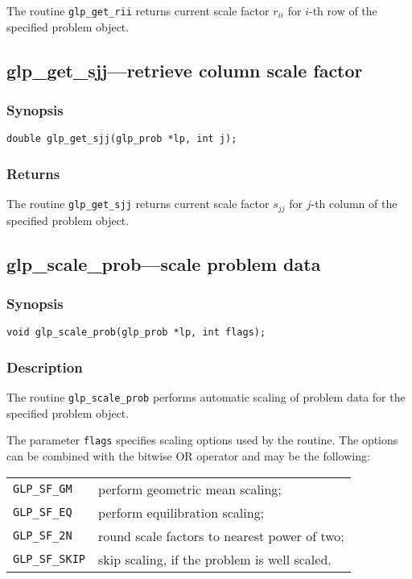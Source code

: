 The routine \verb|glp_get_rii| returns current scale factor $r_{ii}$ for
$i$-th row of the specified problem object.

\subsection{glp\_get\_sjj---retrieve column scale factor}

\subsubsection*{Synopsis}

\begin{verbatim}
double glp_get_sjj(glp_prob *lp, int j);
\end{verbatim}

\subsubsection*{Returns}

The routine \verb|glp_get_sjj| returns current scale factor $s_{jj}$ for
$j$-th column of the specified problem object.

\subsection{glp\_scale\_prob---scale problem data}

\subsubsection*{Synopsis}

\begin{verbatim}
void glp_scale_prob(glp_prob *lp, int flags);
\end{verbatim}

\subsubsection*{Description}

The routine \verb|glp_scale_prob| performs automatic scaling of problem
data for the specified problem object.

The parameter \verb|flags| specifies scaling options used by the
routine. The options can be combined with the bitwise OR operator and
may be the following:

\begin{tabular}{@{}ll}
\verb|GLP_SF_GM| & perform geometric mean scaling;\\
\verb|GLP_SF_EQ| & perform equilibration scaling;\\
\verb|GLP_SF_2N| & round scale factors to nearest power of two;\\
\verb|GLP_SF_SKIP| & skip scaling, if the problem is well scaled.\\
\end{tabular}

